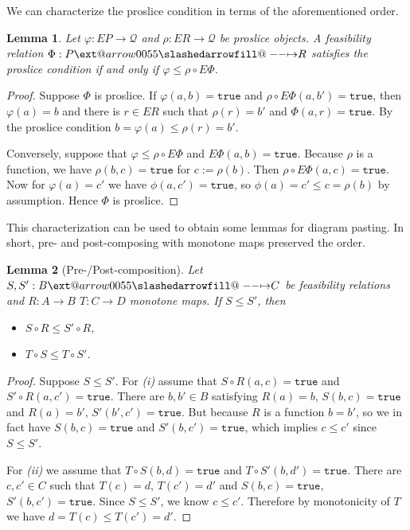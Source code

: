 \documentclass[12pt]{article}
\makeatletter
\theoremstyle{definition}
\theoremstyle{plain}
\newtheorem{lemma}{Lemma}[section]
\theoremstyle{plain}
\theoremstyle{plain}
\theoremstyle{plain}
\theoremstyle{remark}
\theoremstyle{remark}
\newcommand{\mc}[1]{\mathcal{#1}}
\def\slashedarrowfill@#1#2#3#4#5{%
	$\m@th\thickmuskip0mu\medmuskip\thickmuskip\thinmuskip\thickmuskip
	\relax#5#1\mkern-7mu%
	\cleaders\hbox{$#5\mkern-2mu#2\mkern-2mu$}\hfill
	\mathclap{#3}\mathclap{#2}%
	\cleaders\hbox{$#5\mkern-2mu#2\mkern-2mu$}\hfill
	\mkern-7mu#4$%
}
\def\rightslashedarrowfill@{%
	\slashedarrowfill@\relbar\relbar\mapstochar\rightarrow}
\newcommand\xslashedrightarrow[2][]{%
	\ext@arrow 0055{\rightslashedarrowfill@}{#1}{#2}}
\makeatother
\begin{document}
We can characterize the proslice condition in terms of the aforementioned order.

\begin{lemma}\label{proslice char}
	Let $\varphi: EP \rightarrow \mc{Q}$ and $\rho: ER \rightarrow \mc{Q}$ be proslice objects. A feasibility relation $\Phi: P \xslashedrightarrow{} R$ satisfies the proslice condition if and only if $\varphi \leq \rho \circ E\Phi$.
\end{lemma}
\begin{proof}
	Suppose $\Phi$ is proslice. If $\varphi(a,b) = \mathtt{true}$ and $\rho \circ E\Phi (a,b') = \mathtt{true}$, then $\varphi(a) = b$ and there is $r \in ER$ such that $\rho(r) = b'$ and $\Phi(a,r) = \mathtt{true}$. By the proslice condition $b = \varphi(a) \leq \rho(r) = b'$.
	
	Conversely, suppose that $\varphi \leq \rho \circ E\Phi$ and $E\Phi(a,b) = \mathtt{true}$. Because $\rho$ is a function, we have $\rho(b,c) = \mathtt{true}$ for $c := \rho(b)$. Then $\rho \circ E\Phi(a,c) = \mathtt{true}$. Now for $\varphi(a) = c'$ we have $\phi(a,c') = \mathtt{true}$, so $\phi(a) = c' \leq c = \rho(b)$ by assumption. Hence $\Phi$ is proslice.
\end{proof}

This characterization can be used to obtain some lemmas for diagram pasting. In short, pre- and post-composing with monotone maps preserved the order.

\begin{lemma}[Pre-/Post-composition]\label{pasting lemma}
	Let $S, S': B \xslashedrightarrow{} C$ be feasibility relations and $R: A \rightarrow B$ $T: C \rightarrow D$ monotone maps. If $S \leq S'$, then
	\begin{itemize}
		\item[(i)] $S \circ R \leq S' \circ R$,
		\item[(ii)] $T \circ S \leq T \circ S'$. 
	\end{itemize}
 
\end{lemma} 
\begin{proof}
	Suppose $S \leq S'$. For \textit{(i)} assume that $S \circ R (a,c) = \mathtt{true}$ and $S' \circ R (a,c') = \mathtt{true}$. There are $b,b' \in B$ satisfying $R(a) = b$, $S(b,c) = \mathtt{true}$ and $R(a) = b'$, $S'(b',c') = \mathtt{true}$. But because $R$ is a function $b = b'$, so we in fact have $S(b,c) = \mathtt{true}$ and $S'(b,c') = \mathtt{true}$, which implies $c \leq c'$ since $S \leq S'$. 
	
	For \textit{(ii)} we assume that $T \circ S (b,d) = \mathtt{true}$ and $T \circ S' (b,d') = \mathtt{true}$. There are $c,c' \in C$ such that $T(c) = d$, $T(c') = d'$ and $S(b,c) = \mathtt{true}$, $S'(b,c') = \mathtt{true}$. Since $S \leq S'$, we know $c \leq c'$. Therefore by monotonicity of $T$ we have $d = T(c) \leq T(c') = d'$.
\end{proof}
\end{document}
